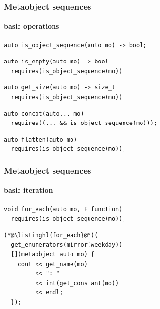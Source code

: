 \documentclass[compress,table,xcolor=table]{beamer}
\begin{document}
\begin{frame}[fragile]
  \frametitle{Metaobject sequences}
  \framesubtitle{basic operations}
  \begin{lstlisting}[language=c++2x,basicstyle=\small\ttfamily]
auto is_object_sequence(auto mo) -> bool;
  \end{lstlisting}
  \vfill
  \begin{lstlisting}[language=c++2x,basicstyle=\small\ttfamily]
auto is_empty(auto mo) -> bool
  requires(is_object_sequence(mo));
  \end{lstlisting}
  \vfill
  \begin{lstlisting}[language=c++2x,basicstyle=\small\ttfamily]
auto get_size(auto mo) -> size_t
  requires(is_object_sequence(mo));
  \end{lstlisting}
  \vfill
  \begin{lstlisting}[language=c++2x,basicstyle=\small\ttfamily]
auto concat(auto... mo)
  requires((... && is_object_sequence(mo)));
  \end{lstlisting}
  \vfill
  \begin{lstlisting}[language=c++2x,basicstyle=\small\ttfamily]
auto flatten(auto mo)
  requires(is_object_sequence(mo));
  \end{lstlisting}
\end{frame}
\begin{frame}[fragile]
  \frametitle{Metaobject sequences}
  \framesubtitle{basic iteration}
  \begin{lstlisting}[language=c++2x,basicstyle=\small\ttfamily]
void for_each(auto mo, F function)
  requires(is_object_sequence(mo));
  \end{lstlisting}
  \begin{lstlisting}[language=c++2x]
(*@\listinghl{for_each}@*)(
  get_enumerators(mirror(weekday)),
  [](metaobject auto mo) {
    cout << get_name(mo)
         << ": "
         << int(get_constant(mo))
         << endl;
  });
  \end{lstlisting}
\end{frame}
\end{document}
